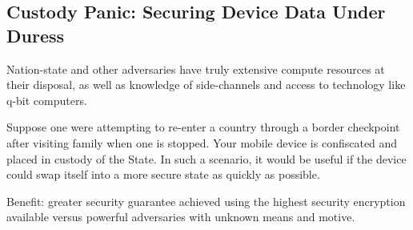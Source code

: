 \subsection{Custody Panic: Securing Device Data Under Duress}

Nation-state and other adversaries have truly extensive compute resources at
their disposal, as well as knowledge of side-channels and access to technology
like q-bit computers.

Suppose one were attempting to re-enter a country through a border checkpoint
after visiting family when one is stopped. Your mobile device is confiscated and
placed in custody of the State. In such a scenario, it would be useful if the
device could swap itself into a more secure state as quickly as possible.

Benefit: greater security guarantee achieved using the highest security
encryption available versus powerful adversaries with unknown means and motive.
